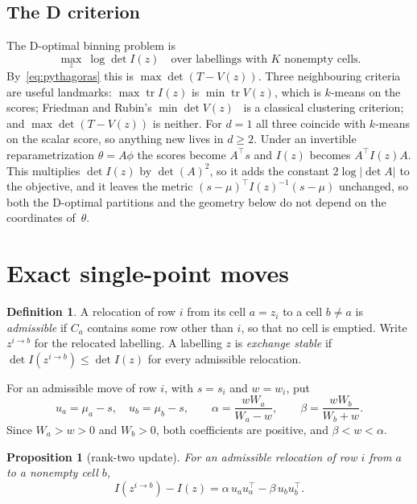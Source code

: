 \documentclass[11pt]{amsart}
\newtheorem{proposition}[theorem]{Proposition}
\theoremstyle{definition}
\newtheorem{definition}[theorem]{Definition}
\theoremstyle{remark}
\newcommand{\tr}{\operatorname{tr}}
\newcommand{\T}{^{\top}}
\newcommand{\Ib}{I(z)}
\begin{document}
\subsection*{The D criterion}
The D-optimal binning problem is
\begin{equation}\label{eq:dopt}
\max_{z}\ \log\det\Ib\quad\text{over labellings with $K$ nonempty cells.}
\end{equation}
By~\eqref{eq:pythagoras} this is $\max\det(T-V(z))$. Three neighbouring criteria are useful
landmarks: $\max\tr\Ib$ is $\min\tr V(z)$, which is $k$-means on the scores; Friedman and
Rubin's $\min\det V(z)$~\cite{friedman1967,marriott1971,scott1971} is a classical clustering
criterion; and $\max\det(T-V(z))$ is neither. For $d=1$ all three coincide with $k$-means on the
scalar score, so anything new lives in $d\ge2$. Under an invertible reparametrization
$\theta=A\phi$ the scores become $A\T s$ and $\Ib$ becomes $A\T\Ib A$. This multiplies
$\det\Ib$ by $\det(A)^2$, so it adds the constant $2\log|\det A|$ to the objective, and it leaves the metric $(s-\mu)\T\Ib^{-1}(s-\mu)$ unchanged, so both the
D-optimal partitions and the geometry below do not depend on the coordinates of~$\theta$.

\section{Exact single-point moves}\label{sec:moves}

\begin{definition}\label{def:move}
A relocation of row $i$ from its cell $a=z_i$ to a cell $b\ne a$ is \emph{admissible} if $C_a$
contains some row other than $i$, so that no cell is emptied. Write $z^{i\to b}$ for the
relocated labelling. A labelling $z$ is \emph{exchange stable} if
$\det I(z^{i\to b})\le\det\Ib$ for every admissible relocation.
\end{definition}

For an admissible move of row $i$, with $s=s_i$ and $w=w_i$, put
\begin{equation}\label{eq:coeffs}
u_a=\mu_a-s,\quad u_b=\mu_b-s,\qquad \alpha=\frac{wW_a}{W_a-w},\qquad \beta=\frac{wW_b}{W_b+w}.
\end{equation}
Since $W_a>w>0$ and $W_b>0$, both coefficients are positive, and $\beta<w<\alpha$.

\begin{proposition}[rank-two update]\label{prop:rank2}
For an admissible relocation of row $i$ from $a$ to a nonempty cell $b$,
\[
I(z^{i\to b})-\Ib=\alpha\,u_au_a\T-\beta\,u_bu_b\T .
\]
\end{proposition}
\end{document}
